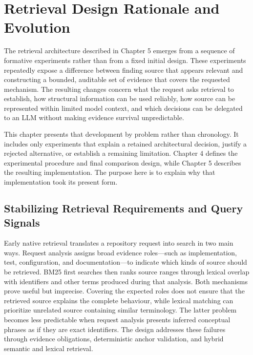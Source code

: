 \chapter{Retrieval Design Rationale and Evolution}\label{ch:retrieval-design-rationale-and-evolution}

The retrieval architecture described in Chapter 5 emerges from a sequence of formative experiments rather than from a fixed initial design. These experiments repeatedly expose a difference between finding source that appears relevant and constructing a bounded, auditable set of evidence that covers the requested mechanism. The resulting changes concern what the request asks retrieval to establish, how structural information can be used reliably, how source can be represented within limited model context, and which decisions can be delegated to an LLM without making evidence survival unpredictable.

This chapter presents that development by problem rather than chronology. It includes only experiments that explain a retained architectural decision, justify a rejected alternative, or establish a remaining limitation. Chapter 4 defines the experimental procedure and final comparison design, while Chapter 5 describes the resulting implementation. The purpose here is to explain why that implementation took its present form.

\section{Stabilizing Retrieval Requirements and Query Signals}\label{sec:stabilizing-retrieval-requirements-and-query-signals}

Early native retrieval translates a repository request into search in two main ways. Request analysis assigns broad evidence roles---such as implementation, test, configuration, and documentation---to indicate which kinds of source should be retrieved. BM25 first searches then ranks source ranges through lexical overlap with identifiers and other terms produced during that analysis. Both mechanisms prove useful but imprecise. Covering the expected roles does not ensure that the retrieved source explains the complete behaviour, while lexical matching can prioritize unrelated source containing similar terminology. The latter problem becomes less predictable when request analysis presents inferred conceptual phrases as if they are exact identifiers. The design addresses these failures through evidence obligations, deterministic anchor validation, and hybrid semantic and lexical retrieval.

